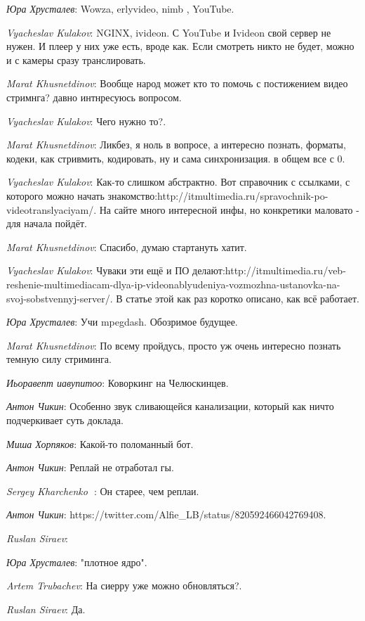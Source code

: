 \documentclass[10pt]{book}
\newcommand{\AUTHOR}[1]{\emph{#1}:}
\begin{document}
\AUTHOR{Юра Хрусталев} Wowza, erlyvideo, nimb , YouTube.

\AUTHOR{Vyacheslav Kulakov} NGINX, ivideon. С YouTube и Ivideon свой сервер не нужен. И плеер у них уже есть, вроде как. Если смотреть никто не будет, можно и с камеры сразу транслировать.

\AUTHOR{Marat Khusnetdinov} Вообще народ может кто то помочь с постижением видео стримнга? давно интнресуюсь вопросом.

\AUTHOR{Vyacheslav Kulakov} Чего нужно то?.

\AUTHOR{Marat Khusnetdinov} Ликбез, я ноль в вопросе, а интересно познать, форматы, кодеки, как стривмить, кодировать, ну и сама синхронизация. в общем все с 0.

\AUTHOR{Vyacheslav Kulakov} Как-то слишком абстрактно. Вот справочник с ссылками, с которого можно начать знакомство:http://itmultimedia.ru/spravochnik-po-videotranslyaciyam/. На сайте много интересной инфы, но конкретики маловато - для начала пойдёт.

\AUTHOR{Marat Khusnetdinov} Спасибо, думаю стартануть хатит.

\AUTHOR{Vyacheslav Kulakov} Чуваки эти ещё и ПО делают:http://itmultimedia.ru/veb-reshenie-multimediacam-dlya-ip-videonablyudeniya-vozmozhna-ustanovka-na-svoj-sobstvennyj-server/. В статье этой как раз коротко описано, как всё работает.

\AUTHOR{Юра Хрусталев} Учи mpegdash. Обозримое будущее.

\AUTHOR{Marat Khusnetdinov} По всему пройдусь, просто уж очень интересно познать темную силу стриминга.

\AUTHOR{Иьоравепт иавупитоо} Коворкинг на Челюскинцев.

\AUTHOR{Антон Чикин} Особенно звук сливающейся канализации, который как ничто подчеркивает суть доклада.

\AUTHOR{Миша Хорпяков} Какой-то поломанный бот.

\AUTHOR{Антон Чикин} Реплай не отработал гы.

\AUTHOR{Sergey Kharchenko 🦁} Он старее, чем реплаи.

\AUTHOR{Антон Чикин} https://twitter.com/Alfie_LB/status/820592466042769408.

\AUTHOR{Ruslan Siraev}

\AUTHOR{Юра Хрусталев} "плотное ядро".

\AUTHOR{Artem Trubachev} На сиерру уже можно обновляться?.

\AUTHOR{Ruslan Siraev} Да.
\end{document}
